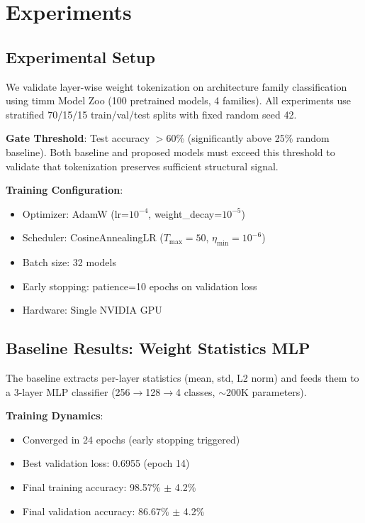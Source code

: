 \section{Experiments}

\subsection{Experimental Setup}

We validate layer-wise weight tokenization on architecture family classification using timm Model Zoo (100 pretrained models, 4 families). All experiments use stratified 70/15/15 train/val/test splits with fixed random seed 42.

\textbf{Gate Threshold}: Test accuracy $>$60\% (significantly above 25\% random baseline). Both baseline and proposed models must exceed this threshold to validate that tokenization preserves sufficient structural signal.

\textbf{Training Configuration}:
\begin{itemize}
\item Optimizer: AdamW (lr=$10^{-4}$, weight\_decay=$10^{-5}$)
\item Scheduler: CosineAnnealingLR ($T_{\text{max}}=50$, $\eta_{\text{min}}=10^{-6}$)
\item Batch size: 32 models
\item Early stopping: patience=10 epochs on validation loss
\item Hardware: Single NVIDIA GPU
\end{itemize}

\subsection{Baseline Results: Weight Statistics MLP}

The baseline extracts per-layer statistics (mean, std, L2 norm) and feeds them to a 3-layer MLP classifier (256$\rightarrow$128$\rightarrow$4 classes, $\sim$200K parameters).

\textbf{Training Dynamics}:
\begin{itemize}
\item Converged in 24 epochs (early stopping triggered)
\item Best validation loss: 0.6955 (epoch 14)
\item Final training accuracy: 98.57\% $\pm$ 4.2\%
\item Final validation accuracy: 86.67\% $\pm$ 4.2\%
\end{itemize}

